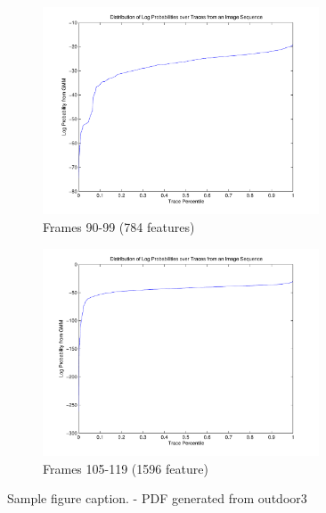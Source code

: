 \begin{figure}[h]
	\begin{subfigure}[b]{0.5\textwidth}
		\centering
		\includegraphics[width=0.9\textwidth]{figs/logpdfs-frame90.pdf}
		\caption{Frames 90-99 (784 features)}
		\label{fig:logpdfs:90}
	\end{subfigure}%
	\begin{subfigure}[b]{0.5\textwidth}
		\centering
		\includegraphics[width=0.9\textwidth]{figs/logpdfs.pdf}
		\caption{Frames 105-119 (1596 feature) }
		\label{fig:logpdfs:105}
	\end{subfigure}%

	\caption{Sample figure caption. - PDF generated from outdoor3}
	\label{fig:logpdfs}
\end{figure}

